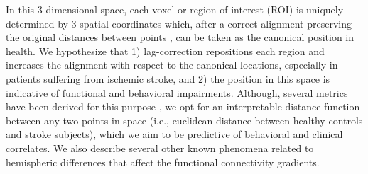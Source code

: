 \documentclass[fleqn,10pt]{wlscirep}
\begin{document}
In this 3-dimensional space, each voxel or region of interest (ROI) is uniquely determined by 3 spatial coordinates which, after a correct alignment preserving the original distances between points \citep{vos2020brainspace}, can be taken as the canonical position in health. We hypothesize that 1) lag-correction repositions each region and increases the alignment with respect to the canonical locations, especially in patients suffering from ischemic stroke, and 2) the position in this space is indicative of functional and behavioral impairments. Although, several metrics have been derived for this purpose \citep{del2022higher,valk2023functional}, we opt for an interpretable distance function between any two points in space (i.e., euclidean distance between healthy controls and stroke subjects), which we aim to be predictive of behavioral and clinical correlates. We also describe several other known phenomena related to hemispheric differences that affect the functional connectivity gradients.
\end{document}
